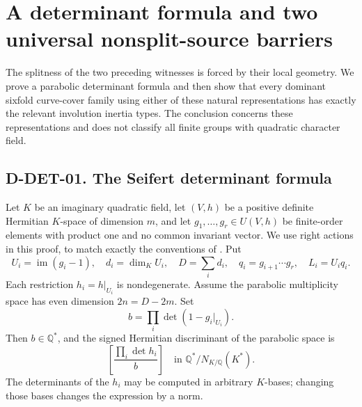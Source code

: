 \section{A determinant formula and two universal nonsplit-source barriers}
\label{sec:finite-source-barrier}

The splitness of the two preceding witnesses is forced by their local
geometry.  We prove a parabolic determinant formula and then show that
every dominant sixfold curve-cover family using either of these natural
representations has exactly the relevant involution inertia types.
The conclusion concerns these representations and does not classify all
finite groups with quadratic character field.

\subsection*{D-DET-01. The Seifert determinant formula}

Let \(K\) be an imaginary quadratic field, let \((V,h)\) be a positive
definite Hermitian \(K\)-space of dimension \(m\), and let
\(g_1,\ldots,g_r\in U(V,h)\) be finite-order elements with product one
and no common invariant vector.  We use right actions in this proof, to
match exactly the conventions of \cite[Theorem 2.5, p.~12]{G34:DWdual}.
Put
\[
 U_i=\operatorname{im}(g_i-1),\quad d_i=\dim_KU_i,\quad
 D=\sum_i d_i,\quad q_i=g_{i+1}\cdots g_r,
 \quad L_i=U_iq_i.
\]
Each restriction \(h_i=h|_{U_i}\) is nondegenerate.  Assume the
parabolic multiplicity space has even dimension \(2n=D-2m\).
Set
\[
                   b=\prod_i\det(1-g_i|_{U_i}).
\]
Then \(b\in\mathbb Q^*\), and the signed Hermitian discriminant of
the parabolic space is
\begin{equation}\label{eq:det-seifert}
       \boxed{\displaystyle
       \left[\frac{\prod_i\det h_i}{b}\right]
          \quad\text{in }\mathbb Q^*/N_{K/\mathbb Q}(K^*).}
\end{equation}
The determinants of the \(h_i\) may be computed in arbitrary
\(K\)-bases; changing those bases changes the expression by a norm.


